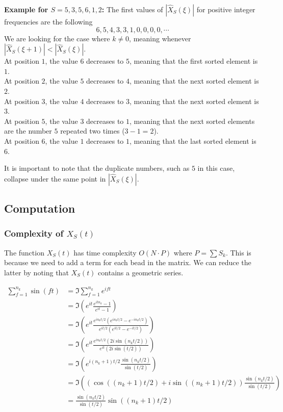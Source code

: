 \documentclass{article}
\begin{document}
\textbf{Example for \(S = 5,3,5,6,1,2\):}
The first values of \(|\hat{X}_S(\xi)|\) for positive integer frequencies are the following
\[
    6, 5, 4, 3, 3, 1, 0, 0, 0, 0, \cdots
\]
We are looking for the case where \(k \neq 0\), meaning whenever
\(|\hat{X}_S(\xi+1)| < |\hat{X}_S(\xi)|\). \\
At position \(1\), the value \(6\) decreases to \(5\), meaning that the first sorted element is \(1\). \\
At position \(2\), the value \(5\) decreases to \(4\), meaning that the next sorted element is \(2\). \\
At position \(3\), the value \(4\) decreases to \(3\), meaning that the next sorted element is \(3\). \\
At position \(5\), the value \(3\) decreases to \(1\), meaning that the next sorted elements are the number \(5\)
repeated two times (\(3-1=2\)). \\
At position \(6\), the value \(1\) decreases to \(1\), meaning that the last sorted element is \(6\).

It is important to note that the duplicate numbers,
such as \(5\) in this case, collapse under the same
point in \(|\hat{X}_S(\xi)|\).

\pagebreak

\subsection{Computation}

\subsubsection{Complexity of \(X_S(t)\)}

The function \(X_S(t)\) has time complexity \(O(N\cdot P)\) where
\(P=\sum S_k\).
This is because we need to add a term for each bead in the matrix.
We can reduce the latter by noting that \(X_S(t)\) contains
a geometric series.

\begin{align*}
    \sum_{f=1}^{n_k} \sin(ft) 
    &= \Im \sum_{f=1}^{n_k} e^{ift} \\
    &= \Im \left( e^{it} \frac{e^{itn_k}-1}{e^{it}-1} \right) \\
    &= \Im \left( e^{it} \frac{e^{in_kt/2}(e^{in_kt/2} - e^{-in_kt/2})}
        {e^{it/2}(e^{it/2} - e^{-it/2})} \right) \\
    &= \Im \left( e^{it} \frac{e^{in_kt/2}(2i\sin(n_kt/2))}
        {e^{it} (2i\sin(t/2))} \right) \\
    &= \Im \left( e^{i(n_k+1)t/2} \frac{\sin(n_k t/2)}{\sin(t/2)} \right) \\
    &= \Im \left(
            ( \cos((n_k+1)t/2) + i\sin((n_k+1)t/2)) \frac{\sin(n_k t/2)}{\sin(t/2)}
        \right) \\
    &= \frac{\sin(n_k t/2)}{\sin(t/2)} \sin((n_k+1)t/2)
\end{align*}
\end{document}
